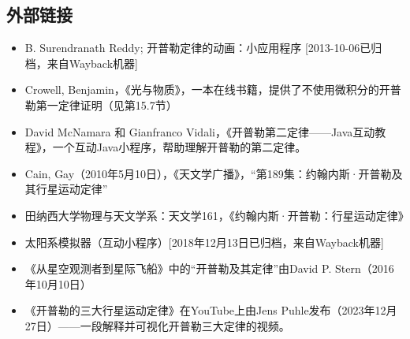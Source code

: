 \subsection{外部链接}
\begin{itemize}
\item B. Surendranath Reddy; 开普勒定律的动画：小应用程序 [2013-10-06已归档，来自Wayback机器]
\item Crowell, Benjamin，《光与物质》，一本在线书籍，提供了不使用微积分的开普勒第一定律证明（见第15.7节）
\item David McNamara 和 Gianfranco Vidali，《开普勒第二定律——Java互动教程》，一个互动Java小程序，帮助理解开普勒的第二定律。
\item Cain, Gay（2010年5月10日），《天文学广播》，“第189集：约翰内斯·开普勒及其行星运动定律”
\item 田纳西大学物理与天文学系：天文学161，《约翰内斯·开普勒：行星运动定律》
\item 太阳系模拟器（互动小程序）[2018年12月13日已归档，来自Wayback机器]
\item 《从星空观测者到星际飞船》中的“开普勒及其定律”由David P. Stern（2016年10月10日）
\item 《开普勒的三大行星运动定律》在YouTube上由Jens Puhle发布（2023年12月27日）——一段解释并可视化开普勒三大定律的视频。
\end{itemize}





 
 

